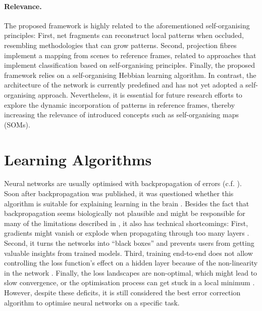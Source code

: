 
\paragraph{Relevance.} The proposed framework is highly related to the aforementioned self-organising principles: First, net fragments can reconstruct local patterns when occluded, resembling methodologies that can grow patterns. Second, projection fibres implement a mapping from scenes to reference frames, related to approaches that implement classification based on self-organising principles. Finally, the proposed framework relies on a self-organising Hebbian learning algorithm.
In contrast, the architecture of the network is currently predefined and has not yet adopted a self-organising approach. Nevertheless, it is essential for future research efforts to explore the dynamic incorporation of patterns in reference frames, thereby increasing the relevance of introduced concepts such as self-organising maps (SOMs).



\section{Learning Algorithms}
Neural networks are usually optimised with backpropagation of errors (c.f. ).
Soon after backpropagation was published, it was questioned whether this algorithm is suitable for explaining learning in the brain .
Besides the fact that backpropagation seems biologically not plausible and might be responsible for many of the limitations described in , it also has technical shortcomings:
First, gradients might vanish or explode when propagating through too many layers .
Second, it turns the networks into ``black boxes'' and prevents users from getting valuable insights from trained models.
Third, training end-to-end does not allow controlling the loss function's effect on a hidden layer because of the non-linearity in the network .
Finally, the loss landscapes are non-optimal, which might lead to slow convergence, or the optimisation process can get stuck in a local minimum  .
However, despite these deficits, it is still considered the best error correction algorithm to optimise neural networks on a specific task. 

